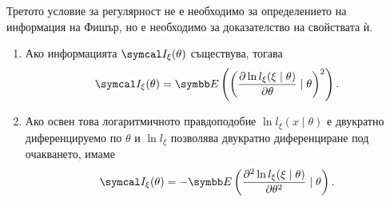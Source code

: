 \documentclass[numbers=endperiod, bibliography=totocnumbered]{scrartcl}
\begin{document}
\begin{remark}
  Третото условие за регулярност не е необходимо за определението на информация на Фишър, но е необходимо за доказателство на свойствата ѝ.
\end{remark}

\begin{theorem}
  \mbox{}
  \begin{enumerate}
    \item Ако информацията \( \FisherInfo_\xi(\theta) \) съществува, тогава
    \begin{align*}
      \FisherInfo_\xi(\theta) = \Expect\left( {\left( \frac {\partial \ln l_\xi(\xi \mid \theta)} {\partial \theta} \mid \theta \right)}^2 \right).
    \end{align*}

    \item Ако освен това логаритмичното правдоподобие \( \ln l_\xi (x \mid \theta) \) е двукратно диференцируемо по \( \theta \) и \( \ln l_\xi \) позволява двукратно диференциране под очакването, имаме
    \begin{align*}
      \FisherInfo_\xi(\theta) = -\Expect\left( \frac {\partial^2 \ln l_\xi(\xi \mid \theta)} {\partial \theta^2} \mid \theta \right).
    \end{align*}
  \end{enumerate}
\end{theorem}
\end{document}
